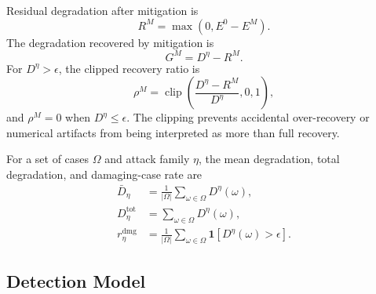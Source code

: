 Residual degradation after mitigation is
\begin{equation}
    R^{M}
    =
    \max\left(0, E^0 - E^{M}\right).
    \label{eq:residual_degradation}
\end{equation}
The degradation recovered by mitigation is
\begin{equation}
    G^{M}
    =
    D^{\eta} - R^{M}.
    \label{eq:degradation_recovered}
\end{equation}
For $D^{\eta} > \epsilon$, the clipped recovery ratio is
\begin{equation}
    \rho^{M}
    =
    \operatorname{clip}
    \left(
        \frac{D^{\eta}-R^{M}}{D^{\eta}},
        0,
        1
    \right),
    \label{eq:recovery_ratio}
\end{equation}
and $\rho^{M}=0$ when $D^{\eta}\leq \epsilon$. The clipping prevents accidental over-recovery or numerical artifacts from being interpreted as more than full recovery.

For a set of cases $\Omega$ and attack family $\eta$, the mean degradation, total degradation, and damaging-case rate are
\begin{align}
    \bar{D}_{\eta}
    &=
    \frac{1}{|\Omega|}
    \sum_{\omega \in \Omega}
    D^{\eta}(\omega),\\
    D_{\eta}^{\mathrm{tot}}
    &=
    \sum_{\omega \in \Omega}
    D^{\eta}(\omega),\\
    r_{\eta}^{\mathrm{dmg}}
    &=
    \frac{1}{|\Omega|}
    \sum_{\omega \in \Omega}
    \mathbf{1}
    \left[
        D^{\eta}(\omega) > \epsilon
    \right].
    \label{eq:aggregate_metrics}
\end{align}

\subsection{Detection Model}
\label{subsec:detection_model}

